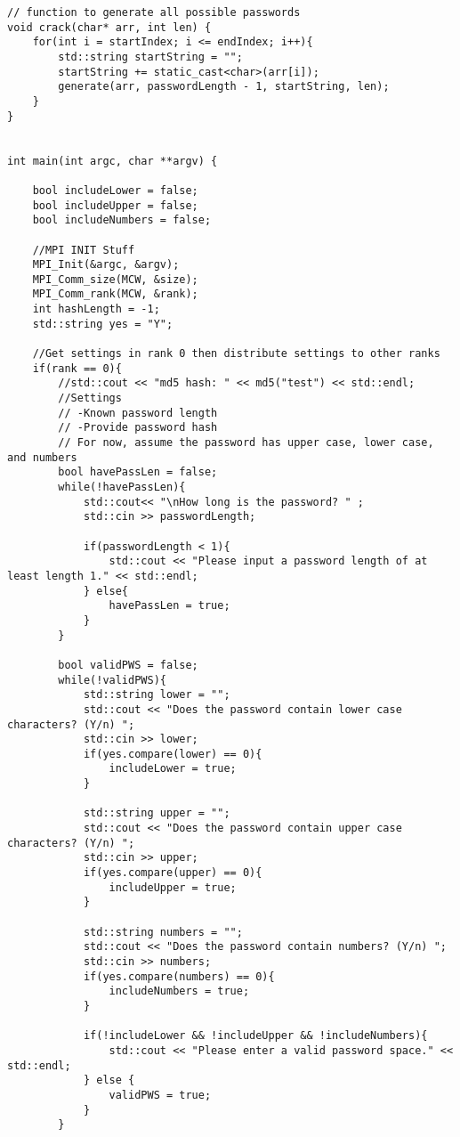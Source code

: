 \documentclass[11pt]{article}
\begin{document}
\begin{verbatim}
// function to generate all possible passwords
void crack(char* arr, int len) {
    for(int i = startIndex; i <= endIndex; i++){
        std::string startString = "";
        startString += static_cast<char>(arr[i]);
        generate(arr, passwordLength - 1, startString, len);
    }
}


int main(int argc, char **argv) {

	bool includeLower = false;
	bool includeUpper = false;
	bool includeNumbers = false;

	//MPI INIT Stuff
	MPI_Init(&argc, &argv);
	MPI_Comm_size(MCW, &size);
	MPI_Comm_rank(MCW, &rank);
    int hashLength = -1;
    std::string yes = "Y";

	//Get settings in rank 0 then distribute settings to other ranks
	if(rank == 0){
        //std::cout << "md5 hash: " << md5("test") << std::endl;
		//Settings 
		// -Known password length
		// -Provide password hash
		// For now, assume the password has upper case, lower case, and numbers
		bool havePassLen = false;
		while(!havePassLen){
            std::cout<< "\nHow long is the password? " ;
            std::cin >> passwordLength;

            if(passwordLength < 1){
                std::cout << "Please input a password length of at least length 1." << std::endl;
            } else{
                havePassLen = true;
            }
		}

		bool validPWS = false;
		while(!validPWS){
            std::string lower = "";
            std::cout << "Does the password contain lower case characters? (Y/n) ";
            std::cin >> lower;
            if(yes.compare(lower) == 0){
                includeLower = true;
            }

            std::string upper = "";
            std::cout << "Does the password contain upper case characters? (Y/n) ";
            std::cin >> upper;
            if(yes.compare(upper) == 0){
                includeUpper = true;
            }

            std::string numbers = "";
            std::cout << "Does the password contain numbers? (Y/n) ";
            std::cin >> numbers;
            if(yes.compare(numbers) == 0){
                includeNumbers = true;
            }

            if(!includeLower && !includeUpper && !includeNumbers){
                std::cout << "Please enter a valid password space." << std::endl;
            } else {
                validPWS = true;
            }
		}


\end{verbatim}
\end{document}
